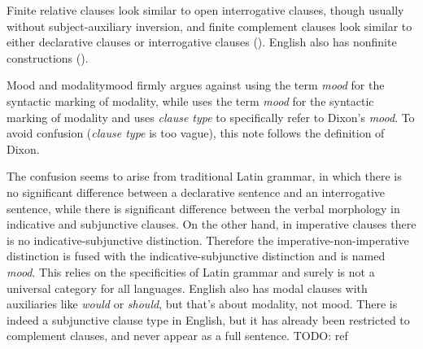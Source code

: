 \documentclass[UTF8, a4paper, oneside, scheme=plain]{ctexrep}
\newcommand*{\term}[1]{\emph{#1}}
\newcommand{\corpus}[1]{\emph{#1}}
\begin{document}
Finite relative clauses look similar to open interrogative clauses,
though usually without subject-auxiliary inversion,
and finite complement clauses look similar to either declarative clauses or interrogative clauses 
().
English also has nonfinite constructions ().

\begin{infobox}{Mood and modality}{mood}
    \citet{dixon2009basic1} firmly argues against using the term \term{mood} 
    for the syntactic marking of modality,
    while \citet{cgel} uses the term \term{mood} for the syntactic marking of modality
    and uses \term{clause type} to specifically refer to Dixon's \term{mood}.
    To avoid confusion (\term{clause type} is too vague),
    this note follows the definition of Dixon.

    The confusion seems to arise from traditional Latin grammar,
    in which there is no significant difference 
    between a declarative sentence and an interrogative sentence, 
    while there is significant difference
    between the verbal morphology in indicative and subjunctive clauses.
    On the other hand, in imperative clauses 
    there is no indicative-subjunctive distinction.
    Therefore the imperative-non-imperative distinction is fused with 
    the indicative-subjunctive distinction 
    and is named \term{mood}.
    This relies on the specificities of Latin grammar 
    and surely is not a universal category for all languages.
    English also has modal clauses with auxiliaries like \corpus{would} or \corpus{should},
    but that's about modality, not mood.
    There is indeed a subjunctive clause type in English,
    but it has already been restricted to complement clauses,
    and never appear as a full sentence. TODO: ref
\end{infobox}
\end{document}
